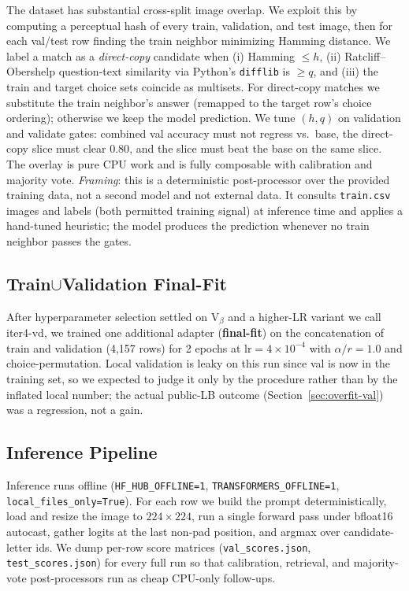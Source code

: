 \documentclass[11pt]{article}
\begin{document}
\label{sec:retrieval}
The dataset has substantial cross-split image overlap. We exploit this by computing a perceptual hash \citep{zauner2010phash} of every train, validation, and test image, then for each val/test row finding the train neighbor minimizing Hamming distance. We label a match as a \emph{direct-copy} candidate when (i) Hamming $\le h$, (ii) Ratcliff--Obershelp question-text similarity \citep{ratcliff1988gestalt} via Python's \texttt{difflib} is $\ge q$, and (iii) the train and target choice sets coincide as multisets. For direct-copy matches we substitute the train neighbor's answer (remapped to the target row's choice ordering); otherwise we keep the model prediction. We tune $(h, q)$ on validation and validate gates: combined val accuracy must not regress vs.\ base, the direct-copy slice must clear $0.80$, and the slice must beat the base on the same slice. The overlay is pure CPU work and is fully composable with calibration and majority vote. \emph{Framing}: this is a deterministic post-processor over the provided training data, not a second model and not external data. It consults \texttt{train.csv} images and labels (both permitted training signal) at inference time and applies a hand-tuned heuristic; the model produces the prediction whenever no train neighbor passes the gates.

\subsection{Train$\cup$Validation Final-Fit}

\label{sec:finfit}
After hyperparameter selection settled on V$_\beta$ and a higher-LR variant we call iter4-vd, we trained one additional adapter (\textbf{final-fit}) on the concatenation of train and validation (4{,}157 rows) for 2 epochs at $\text{lr}=4 \times 10^{-4}$ with $\alpha/r=1.0$ and choice-permutation. Local validation is leaky on this run since val is now in the training set, so we expected to judge it only by the procedure rather than by the inflated local number; the actual public-LB outcome (Section~\ref{sec:overfit-val}) was a regression, not a gain.

\subsection{Inference Pipeline}

Inference runs offline (\texttt{HF\_HUB\_OFFLINE=1}, \texttt{TRANSFORMERS\_OFFLINE=1}, \texttt{local\_files\_only=True}). For each row we build the prompt deterministically, load and resize the image to $224\times224$, run a single forward pass under bfloat16 autocast, gather logits at the last non-pad position, and argmax over candidate-letter ids. We dump per-row score matrices (\texttt{val\_scores.json}, \texttt{test\_scores.json}) for every full run so that calibration, retrieval, and majority-vote post-processors run as cheap CPU-only follow-ups.
\end{document}
